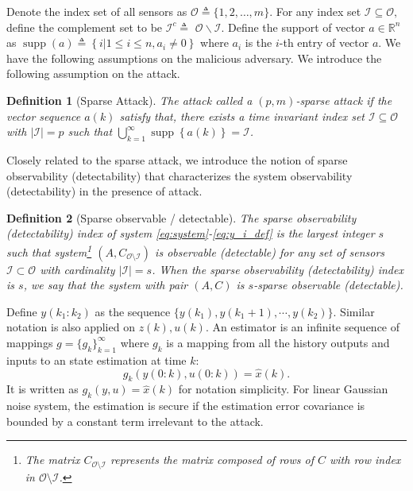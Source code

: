 \documentclass[12pt]{article}  %
\newcommand{\Rb}{{\mathbb{R}}}
\newcommand{\Cc}{{\mathcal{C}}}
\newcommand{\Ic}{{\mathcal{I}}}
\newcommand{\Oc}{{\mathcal{O}}}
\newcommand{\ift}{{\infty}}
\DeclareMathOperator{\supp}{supp}
\newtheorem{definition}{\textbf{Definition}}
\begin{document}
Denote the index set of all sensors as $\Oc \triangleq\{1,2, \ldots, m\}$. 
For any index set $\Ic \subseteq \Oc,$ define the complement set to be $\Ic^{c} \triangleq$ $\Oc \backslash \Ic$. 
Define the support of vector $a\in\Rb^{n}$ as $\supp(a)\triangleq \left\{i| 1\leq i\leq n , a_i\neq0 \right\}$ where $a_i$ is the $i$-th entry of vector $a$.
We have the following assumptions on the malicious adversary. 
We introduce the following assumption on the attack.

\begin{definition}[Sparse Attack]\label{def:attack}
	The attack called a $(p, m)$-sparse attack if the vector sequence $a(k)$ satisfy that,
	there exists a time invariant index set $\Ic\subseteq \Oc $ with $|\Ic| = p$ such that $\bigcup_{k=1}^{\infty} \supp\left\{a(k)\right\} = \Ic$.
\end{definition}

Closely related to the sparse attack, we introduce the notion of sparse observability (detectability) that characterizes the system observability (detectability) in the presence of attack.

\begin{definition}[Sparse observable / detectable]\label{df:sparse_obs}
	The sparse observability (detectability) index of system \eqref{eq:system}-\eqref{eq:y_i_def} is the largest integer $s$ such that system\footnote{The matrix $C_{\Oc\setminus\Ic}$ represents the matrix composed of rows of $C$ with row index in $\Oc\setminus\Ic$.} $(A,C_{\Oc\setminus\Ic})$ is observable (detectable) for any set of sensors $\Ic\subset\Oc$ with cardinality $|\Ic| = s$. When the sparse observability (detectability) index is $s$, we say that the system with pair $(A,C)$ is $s$-sparse observable (detectable).
\end{definition}
Define $y(k_1:k_2)$ as the sequence $\{y(k_1),y(k_1+1),\cdots,y(k_2)\}$. Similar notation is also applied on $z(k),u(k)$.	
An estimator is an infinite sequence of mappings $g=\{g_k\}_{k=1}^{\ift}$ where $g_k$ is a mapping from all the history outputs and inputs to an state estimation at time $k$:
$$g_k\left(y(0:k),u(0:k)\right)=\hat{x}(k).$$
It is written as $g_k(y,u)=\hat{x}(k)$ for notation simplicity.
For linear Gaussian noise system, the estimation is secure if the estimation error covariance is bounded by a constant term irrelevant to the attack. 
\end{document}
